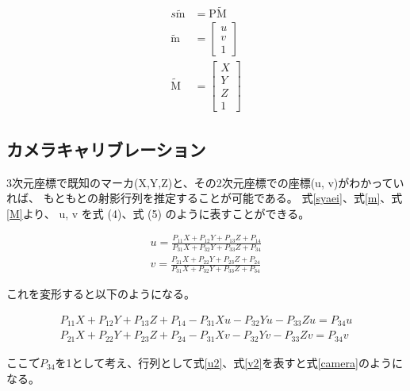\documentclass[11pt,a4j]{jsarticle}
\begin{document}
\begin{align}
  s\mathrm{\tilde{m}} &= \mathrm{P\tilde{M}} \label{syaei} \\[0.3cm]
  \mathrm{\tilde{m}} &= \left[
    \begin{array}{c}
      u \\ v \\ 1
    \end{array}
  \right] \label{m} \\[0.3cm]
  \mathrm{\tilde{M}} &= \left[
    \begin{array}{c}
      X \\ Y \\ Z \\ 1
    \end{array}
  \right] \label{M}
\end{align}



\subsection{カメラキャリブレーション}
\label{sub:カメラキャリブレーション}

3次元座標で既知のマーカ(X,Y,Z)と、その2次元座標での座標(u, v)がわかっていれば、
もともとの射影行列を推定することが可能である。
式\ref{syaei}、式\ref{m}、式\ref{M}より、
u, v を式 (4)、式 (5) のように表すことができる。

\begin{align}
  u = \frac{P_{11}X + P_{12}Y + P_{13}Z + P_{14}}{P_{31}X + P_{32}Y + P_{33}Z + P_{34}}
  \label{u} \\[0.3cm]
  v = \frac{P_{21}X + P_{22}Y + P_{23}Z + P_{24}}{P_{31}X + P_{32}Y + P_{33}Z + P_{34}}
  \label{v}
\end{align}

これを変形すると以下のようになる。

\begin{align}
  P_{11}X + P_{12}Y + P_{13}Z + P_{14} - P_{31}Xu - P_{32}Yu - P_{33}Zu = P_{34}u
  \label{u2} \\
  P_{21}X + P_{22}Y + P_{23}Z + P_{24} - P_{31}Xv - P_{32}Yv - P_{33}Zv = P_{34}v
  \label{v2}
\end{align}

ここて$゙P_{34}$を1として考え、行列として式\ref{u2}、式\ref{v2}を表すと式\ref{camera}のようになる。
\end{document}
